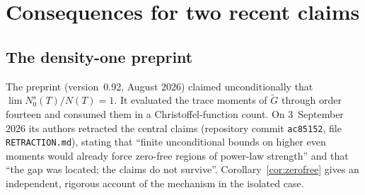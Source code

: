 \documentclass[reqno,11pt]{amsart}
\numberwithin{equation}{section}
\theoremstyle{plain}
\theoremstyle{remark}
\begin{document}
\section{Consequences for two recent claims}\label{s:claims}

\subsection{The density-one preprint}
The preprint \cite{YY26b} (version~0.92, August 2026) claimed unconditionally that
$\lim N_0^{s}(T)/N(T)=1$. It evaluated the trace moments of $\widetilde G$
through order fourteen and consumed them in a Christoffel-function count. On
3~September 2026 its authors retracted the central claims (repository commit
\texttt{ac85152}, file \texttt{RETRACTION.md}), stating that ``finite
unconditional bounds on higher even moments would already force zero-free
regions of power-law strength'' and that ``the gap was located; the claims do
not survive''. Corollary~\ref{cor:zerofree} gives an independent, rigorous
account of the mechanism in the isolated case.
\end{document}
